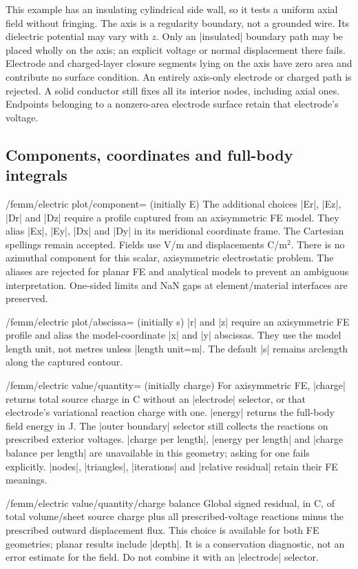 This example has an insulating cylindrical side wall, so it tests a uniform
axial field without fringing. The axis is a regularity boundary, not a grounded
wire. Its dielectric potential may vary with $z$. Only an |insulated| boundary
path may be placed wholly on the axis; an explicit voltage or normal
 displacement there fails. Electrode and charged-layer closure segments lying
on the axis have zero area and contribute no surface condition. An entirely
axis-only electrode or charged path is rejected. A solid conductor still fixes
all its interior nodes, including axial ones. Endpoints belonging to a
nonzero-area electrode surface retain that electrode's voltage.

\subsection{Components, coordinates and full-body integrals}
\begin{key}{/femm/electric plot/component= (initially E)}
The additional choices |Er|, |Ez|, |Dr| and |Dz| require a profile captured
from an axisymmetric FE model. They alias |Ex|, |Ey|, |Dx| and |Dy| in its
meridional coordinate frame. The Cartesian spellings remain accepted.
Fields use V/m and displacements C/m$^2$. There is no azimuthal component
for this scalar, axisymmetric electrostatic problem. The aliases are rejected
for planar FE and analytical models to prevent an ambiguous interpretation.
One-sided limits and NaN gaps at element/material interfaces are preserved.
\end{key}
\begin{key}{/femm/electric plot/abscissa= (initially s)}
|r| and |z| require an axisymmetric FE profile and alias the model-coordinate
|x| and |y| abscissas. They use the model length unit, not metres unless
|length unit=m|. The default |s| remains arclength along the captured contour.
\end{key}
\begin{key}{/femm/electric value/quantity= (initially charge)}
For axisymmetric FE, |charge| returns total source charge in C without an
|electrode| selector, or that electrode's variational reaction charge with one.
|energy| returns the full-body field energy in J. The |outer boundary| selector
still collects the reactions on prescribed exterior voltages.
|charge per length|, |energy per length| and |charge balance per length| are
unavailable in this geometry; asking for one fails explicitly.
|nodes|, |triangles|, |iterations| and |relative residual| retain their FE meanings.
\end{key}
\begin{key}{/femm/electric value/quantity/charge balance}
Global signed residual, in C, of total volume/sheet source charge plus all
prescribed-voltage reactions minus the prescribed outward displacement flux.
This choice is available for both FE geometries; planar results include |depth|.
It is a conservation diagnostic, not an error estimate for the field.
Do not combine it with an |electrode| selector.
\end{key}

